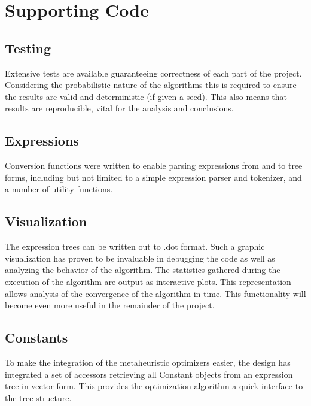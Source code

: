 \documentclass[10pt]{extarticle}
\begin{document}
\section{Supporting Code}
\subsection{Testing}
Extensive tests are available guaranteeing correctness of each part of the project. 
Considering the probabilistic nature of the algorithms this is required to ensure the results are valid and deterministic (if given a seed).
This also means that results are reproducible, vital for the analysis and conclusions.
\subsection{Expressions}
Conversion functions were written to enable parsing expressions from and to tree forms, including but not limited to a simple expression parser and tokenizer, and a number of utility functions.
\subsection{Visualization}
The expression trees can be written out to .dot format. Such a graphic visualization has proven to be invaluable in debugging the code as well as analyzing the behavior of the algorithm. The statistics gathered during the execution of the algorithm are output as interactive plots. This representation allows analysis of the convergence of the algorithm in time. This functionality will become even more useful in the remainder of the project.
\subsection{Constants}
To make the integration of the metaheuristic optimizers easier, the design has integrated a set of accessors retrieving all Constant objects from an expression tree in vector form. This provides the optimization algorithm a quick interface to the tree structure.

\end{document}
